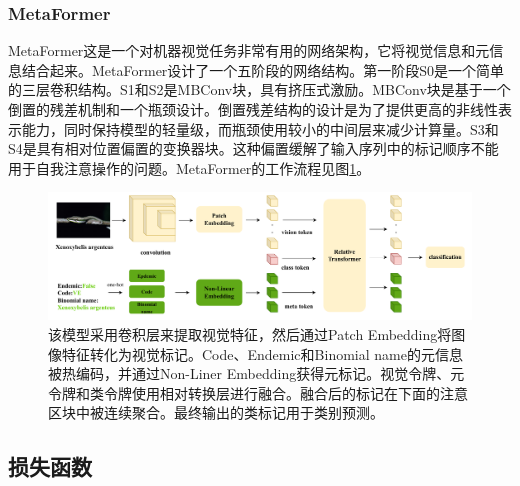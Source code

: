 \documentclass[UTF8,a4paper,10pt]{ctexart}
\begin{document}
\subsubsection{MetaFormer}
MetaFormer\cite{diao2022metaformer}这是一个对机器视觉任务非常有用的网络架构，它将视觉信息和元信息结合起来。MetaFormer设计了一个五阶段的网络结构。第一阶段S0是一个简单的三层卷积结构。S1和S2是MBConv块\cite{sandler2018mobilenetv2}，具有挤压式激励。MBConv块是基于一个倒置的残差机制和一个瓶颈设计。倒置残差结构的设计是为了提供更高的非线性表示能力，同时保持模型的轻量级，而瓶颈使用较小的中间层来减少计算量。S3和S4是具有相对位置偏置的变换器块。这种偏置缓解了输入序列中的标记顺序不能用于自我注意操作的问题。MetaFormer的工作流程见图\ref{figure 2}。
\begin{figure}[h]
  \centering
  \includegraphics[width=\linewidth]{fig/model.pdf}
  \caption{该模型采用卷积层来提取视觉特征，然后通过Patch Embedding将图像特征转化为视觉标记。Code、Endemic和Binomial name的元信息被热编码，并通过Non-Liner Embedding获得元标记。视觉令牌、元令牌和类令牌使用相对转换层进行融合。融合后的标记在下面的注意区块中被连续聚合。最终输出的类标记用于类别预测。}
\label{figure 2}
\end{figure}



\subsection{损失函数}







 


\end{document}
